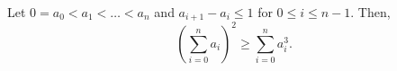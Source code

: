 Let $0 = a_0 < a_1 < \ldots < a_n$ and $a_{i+1} - a_i \leq 1$ for $0 \leq i \leq n - 1$. Then,
\[ \left(\sum_{i=0}^n a_i\right)^2 \geq \sum_{i=0}^n a_i^3. \]
